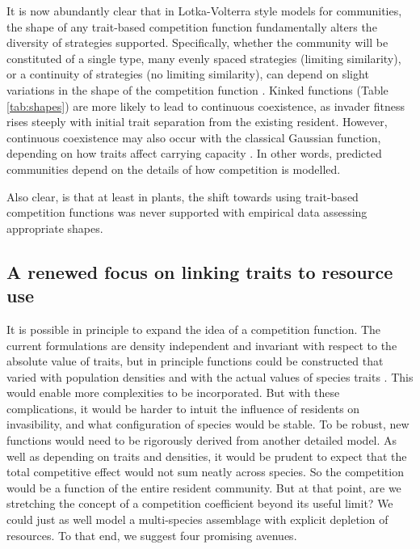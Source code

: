 \documentclass[a4paper,11pt]{article}
\begin{document}
It is now abundantly clear that in Lotka-Volterra style models for communities, the shape of any trait-based competition function fundamentally alters the diversity of strategies supported. Specifically, whether the community will be constituted of a single type, many evenly spaced strategies (limiting similarity), or a continuity of strategies (no limiting similarity), can depend on slight variations in the shape of the competition function \citep{Calcagno-2006, Scheffer-2006, Pigolotti-2007, Barabas-2012,Barabas-2013,DAndrea-2013,Leimar-2013}. Kinked functions (Table \ref{tab:shapes}) are more likely to lead to continuous coexistence, as invader fitness rises steeply with initial trait separation from the existing resident. However, continuous coexistence may also occur with the classical Gaussian function, depending on how traits affect carrying capacity \citep{Leimar-2013}. In other words, predicted communities depend on the details of how competition is modelled.

Also clear, is that at least in plants, the shift towards using trait-based competition functions was never supported with empirical data assessing appropriate shapes.

\subsection{A renewed focus on linking traits to resource use}

It is possible in principle to expand the idea of a competition function. The current formulations are density independent and invariant with respect to the absolute value of traits, but in principle functions could be constructed that varied with population densities and with the actual values of species traits \citep{Abrams-2008,Song-2019}. This would enable more complexities to be incorporated. But with these complications, it would be harder to intuit the influence of residents on invasibility, and what configuration of species would be stable. To be robust, new functions would need to be rigorously derived from another detailed model. As well as depending on traits and densities, it would be prudent to expect that the total competitive effect would not sum neatly across species. So the competition would be a function of the entire resident community. But at that point, are we stretching the concept of a competition coefficient beyond its useful limit? We could just as well model a multi-species assemblage with explicit depletion of resources. To that end, we suggest four promising avenues. 
\end{document}
